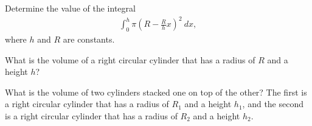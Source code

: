 
\begin{problem}
\item Determine the value of the integral
  \begin{eqnarray*}
    \int^h_0 \pi \left (R-\frac{R}{h} x\right)^2 ~ dx,
  \end{eqnarray*}
  where $h$ and $R$ are constants.
  \vfill

\item What is the volume of a right circular cylinder that has a radius of $R$ and a height $h$?

  \vfill

\item What is the volume of two cylinders stacked one on top of the other?
  The first is a right circular cylinder that has a radius of $R_1$ and a height $h_1$,
  and the second is a right circular cylinder that has a radius of $R_2$ and a height
  $h_2$.

  \vfill

\end{problem}


